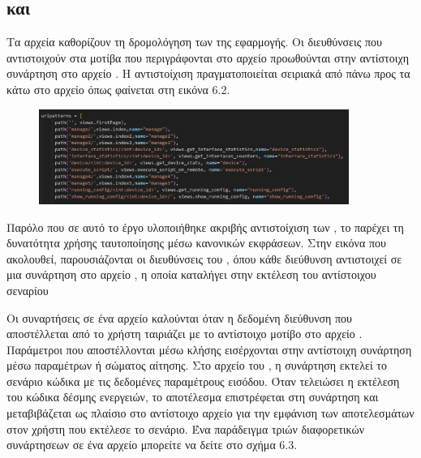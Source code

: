 \subsection{ και }


 Τα αρχεία  καθορίζουν τη δρομολόγηση των  της εφαρμογής. Οι διευθύνσεις  που αντιστοιχούν στα μοτίβα που περιγράφονται στο αρχείο  προωθούνται στην αντίστοιχη συνάρτηση στο αρχείο . Η αντιστοίχιση πραγματοποιείται σειριακά από πάνω προς τα κάτω στο αρχείο  όπως φαίνεται στη εικόνα 6.2. 

\FloatBarrier

\begin{figure}[htb]
	\centering
	\includegraphics[width=0.9\textwidth]{graphics/urlpy.png}
	\caption{ }
\end{figure}

\FloatBarrier

Παρόλο που σε αυτό το έργο υλοποιήθηκε ακριβής αντιστοίχιση των , το  παρέχει τη 
δυνατότητα χρήσης ταυτοποίησης μέσω κανονικών εκφράσεων. Στην εικόνα που ακολουθεί, παρουσιάζονται οι 
διευθύνσεις  του , όπου κάθε διεύθυνση αντιστοιχεί σε μια συνάρτηση στο αρχείο , 
η οποία καταλήγει στην εκτέλεση του αντίστοιχου σεναρίου



Οι συναρτήσεις σε ένα αρχείο  καλούνται όταν η δεδομένη διεύθυνση  που αποστέλλεται από το
χρήστη ταιριάζει με το αντίστοιχο μοτίβο  στο αρχείο . Παράμετροι που αποστέλλονται μέσω κλήσης
 εισέρχονται στην αντίστοιχη συνάρτηση μέσω παραμέτρων ή σώματος αίτησης. Στο αρχείο  του , η συνάρτηση εκτελεί το σενάριο
κώδικα με τις δεδομένες παραμέτρους εισόδου. Όταν τελειώσει η εκτέλεση του κώδικα δέσμης ενεργειών,
το αποτέλεσμα επιστρέφεται στη συνάρτηση  και μεταβιβάζεται ως πλαίσιο στο αντίστοιχο αρχείο  για την εμφάνιση των αποτελεσμάτων στον χρήστη που εκτέλεσε το σενάριο.
Ένα παράδειγμα τριών διαφορετικών συνάρτησεων σε ένα αρχείο  μπορείτε να δείτε στο σχήμα 6.3.

